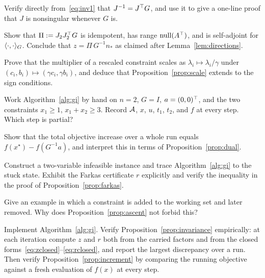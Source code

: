 \begin{exercises}

\begin{exercise}
Verify directly from~\eqref{eq:inv1} that $J^{-1} = J^{\top} G$, and use it to give a
one-line proof that $J$ is nonsingular whenever $G$ is.
\end{exercise}

\begin{exercise}
Show that $\Pi := J_2 J_2^{\top} G$ is idempotent, has range $\operatorname{null}(A^{\top})$, and is
self-adjoint for $\langle \cdot, \cdot \rangle_G$. Conclude that $z = \Pi\,G^{-1}n_*$ as
claimed after Lemma~\ref{lem:directions}.
\end{exercise}

\begin{exercise}
Prove that the multiplier of a rescaled constraint scales as
$\lambda_i \mapsto \lambda_i/\gamma$ under $(c_i,b_i)\mapsto(\gamma c_i,\gamma b_i)$,
and deduce that Proposition~\ref{prop:scale} extends to the sign conditions.
\end{exercise}

\begin{exercise}
Work Algorithm~\ref{alg:gi} by hand on $n = 2$, $G = I$, $a = (0,0)^{\top}$, and the two
constraints $x_1 \ge 1$, $x_1 + x_2 \ge 3$. Record $\mathcal{A}$, $x$, $u$, $t_1$, $t_2$,
and $f$ at every step. Which step is partial?
\end{exercise}

\begin{exercise}
Show that the total objective increase over a whole run equals
$f(x^\star) - f(G^{-1}a)$, and interpret this in terms of
Proposition~\ref{prop:dual}.
\end{exercise}

\begin{exercise}
Construct a two-variable infeasible instance and trace Algorithm~\ref{alg:gi} to the
stuck state. Exhibit the Farkas certificate $r$ explicitly and verify the inequality
in the proof of Proposition~\ref{prop:farkas}.
\end{exercise}

\begin{exercise}
Give an example in which a constraint is added to the working set and later removed.
Why does Proposition~\ref{prop:ascent} not forbid this?
\end{exercise}

\begin{exercise}[Implementation]
Implement Algorithm~\ref{alg:gi}. Verify Proposition~\ref{prop:invariance}
empirically: at each iteration compute $z$ and $r$ both from the carried factors and
from the closed forms~\eqref{eq:zclosed}--\eqref{eq:rclosed}, and report the largest
discrepancy over a run. Then verify Proposition~\ref{prop:increment} by comparing the
running objective against a fresh evaluation of $f(x)$ at every step.
\end{exercise}


\end{exercises}
